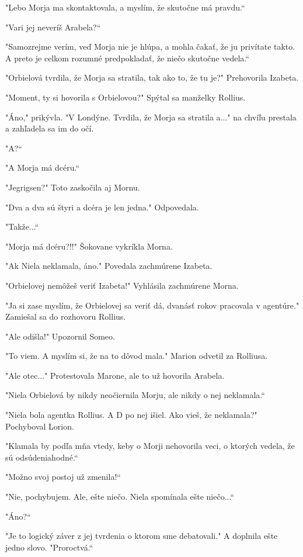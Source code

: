 \documentclass{book}
\begin{document}
"$ $Lebo Morja ma skontaktovala, a myslím, že skutočne má pravdu.“

"$ $Vari jej neveríš Arabela?“

"$ $Samozrejme verím, veď Morja nie je hlúpa, a mohla čakať, že ju privítate takto. A preto je celkom rozumné predpokladať, že niečo skutočne vedela.“

"$ $Orbielová tvrdila, že Morja sa stratila, tak ako to, že tu je?"$ $ Prehovorila Izabeta.

"$ $Moment, ty si hovorila s Orbielovou?"$ $ Spýtal sa manželky Rollius.

"$ $Áno,"$ $ prikývla. "$ $V Londýne. Tvrdila, že Morja sa stratila a..."$ $ na chvíľu prestala a zahľadela sa im do očí.

"$ $A?“

"$ $A Morja má dcéru.“

"$ $Jegrigsen?"$ $ Toto zaskočila aj Mornu.

"$ $Dva a dva sú štyri a dcéra je len jedna."$ $ Odpovedala.

"$ $Takže...“

"$ $Morja má dcéru?!!"$ $ Šokovane vykríkla Morna.

"$ $Ak Niela neklamala, áno."$ $ Povedala zachmúrene Izabeta.

"$ $Orbielovej nemôžeš veriť Izabeta!"$ $ Vyhlásila zachmúrene Morna.

"$ $Ja si zase myslím, že Orbielovej sa veriť dá, dvanásť rokov pracovala v agentúre."$ $ Zamiešal sa do rozhovoru Rollius.

"$ $Ale odišla!"$ $ Upozornil Someo.

"$ $To viem. A myslím si, že na to dôvod mala."$ $ Marion odvetil za Rolliusa.

"$ $Ale otec..."$ $ Protestovala Marone, ale to už hovorila Arabela.

"$ $Niela Orbielová by nikdy neočiernila Morju, ale nikdy o nej neklamala.“

"$ $Niela bola agentka Rollius. A D po nej išiel. Ako vieš, že neklamala?"$ $ Pochyboval Lorion.

"$ $Klamala by podľa mňa vtedy, keby o Morji nehovorila veci, o ktorých vedela, že sú odsúdeniahodné.“

"$ $Možno svoj postoj už zmenila!“

"$ $Nie, pochybujem. Ale, ešte niečo. Niela spomínala ešte niečo...“

"$ $Áno?“

"$ $Je to logický záver z jej tvrdenia o ktorom sme debatovali."$ $ A doplnila ešte jedno slovo. "$ $Proroctvá.“
\end{document}
